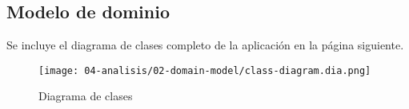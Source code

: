 \subsection{Modelo de dominio}

Se incluye el diagrama de clases completo de la aplicación en la página siguiente.

\clearpage

\begin{sidewaysfigure}
    \texttt{[image: 04-analisis/02-domain-model/class-diagram.dia.png]}
    \caption{Diagrama de clases}
\end{sidewaysfigure}

\clearpage
